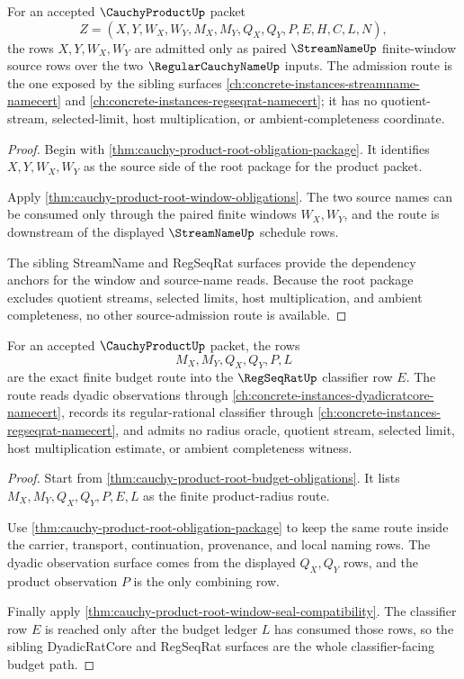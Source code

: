 \begin{theorem}
\label{thm:cauchy-product-paired-window-source-admission}
For an accepted $\CauchyProductUp$ packet
$$
Z=(X,Y,W_X,W_Y,M_X,M_Y,Q_X,Q_Y,P,E,H,C,L,N),
$$
the rows $X,Y,W_X,W_Y$ are admitted only as paired $\StreamNameUp$ finite-window source rows over the two $\RegularCauchyNameUp$ inputs. The admission route is the one exposed by the sibling surfaces \autoref{ch:concrete-instances-streamname-namecert} and \autoref{ch:concrete-instances-regseqrat-namecert}; it has no quotient-stream, selected-limit, host multiplication, or ambient-completeness coordinate.
\end{theorem}
\begin{proof}
Begin with \autoref{thm:cauchy-product-root-obligation-package}. It identifies $X,Y,W_X,W_Y$ as the source side of the root package for the product packet.

Apply \autoref{thm:cauchy-product-root-window-obligations}. The two source names can be consumed only through the paired finite windows $W_X,W_Y$, and the route is downstream of the displayed $\StreamNameUp$ schedule rows.

The sibling StreamName and RegSeqRat surfaces provide the dependency anchors for the window and source-name reads. Because the root package excludes quotient streams, selected limits, host multiplication, and ambient completeness, no other source-admission route is available.
\end{proof}

\begin{theorem}
\label{thm:cauchy-product-budget-route-exactness}
For an accepted $\CauchyProductUp$ packet, the rows
$$
M_X,M_Y,Q_X,Q_Y,P,L
$$
are the exact finite budget route into the $\RegSeqRatUp$ classifier row $E$. The route reads dyadic observations through \autoref{ch:concrete-instances-dyadicratcore-namecert}, records its regular-rational classifier through \autoref{ch:concrete-instances-regseqrat-namecert}, and admits no radius oracle, quotient stream, selected limit, host multiplication estimate, or ambient completeness witness.
\end{theorem}
\begin{proof}
Start from \autoref{thm:cauchy-product-root-budget-obligations}. It lists $M_X,M_Y,Q_X,Q_Y,P,E,L$ as the finite product-radius route.

Use \autoref{thm:cauchy-product-root-obligation-package} to keep the same route inside the carrier, transport, continuation, provenance, and local naming rows. The dyadic observation surface comes from the displayed $Q_X,Q_Y$ rows, and the product observation $P$ is the only combining row.

Finally apply \autoref{thm:cauchy-product-root-window-seal-compatibility}. The classifier row $E$ is reached only after the budget ledger $L$ has consumed those rows, so the sibling DyadicRatCore and RegSeqRat surfaces are the whole classifier-facing budget path.
\end{proof}

